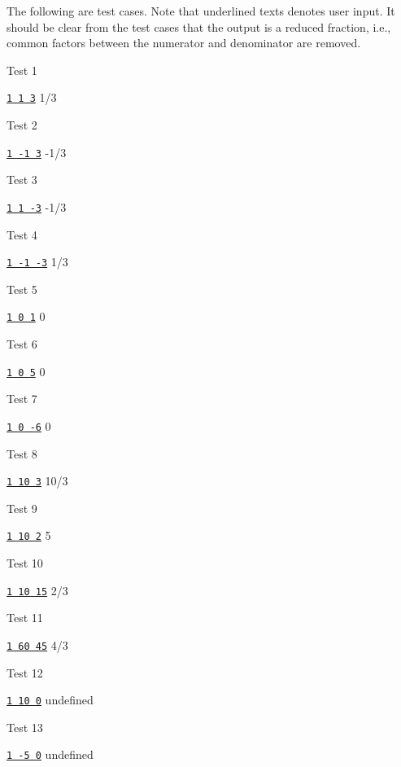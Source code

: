 The following are test cases. Note that underlined texts denotes
user input.
It should be clear from the test cases that the output
is a reduced fraction, i.e., common factors between the numerator
and denominator are removed.

Test 1
\begin{console}[commandchars=\\\{\}]
\underline{\texttt{1 1 3}}
1/3
\end{console}

Test 2
\begin{console}[commandchars=\\\{\}]
\underline{\texttt{1 -1 3}}
-1/3
\end{console}

Test 3
\begin{console}[commandchars=\\\{\}]
\underline{\texttt{1 1 -3}}
-1/3
\end{console}

Test 4
\begin{console}[commandchars=\\\{\}]
\underline{\texttt{1 -1 -3}}
1/3
\end{console}

Test 5
\begin{console}[commandchars=\\\{\}]
\underline{\texttt{1 0 1}}
0
\end{console}

Test 6
\begin{console}[commandchars=\\\{\}]
\underline{\texttt{1 0 5}}
0
\end{console}

Test 7
\begin{console}[commandchars=\\\{\}]
\underline{\texttt{1 0 -6}}
0
\end{console}

Test 8
\begin{console}[commandchars=\\\{\}]
\underline{\texttt{1 10 3}}
10/3
\end{console}

Test 9
\begin{console}[commandchars=\\\{\}]
\underline{\texttt{1 10 2}}
5
\end{console}

Test 10
\begin{console}[commandchars=\\\{\}]
\underline{\texttt{1 10 15}}
2/3
\end{console}

Test 11
\begin{console}[commandchars=\\\{\}]
\underline{\texttt{1 60 45}}
4/3
\end{console}

Test 12
\begin{console}[commandchars=\\\{\}]
\underline{\texttt{1 10 0}}
undefined
\end{console}

Test 13
\begin{console}[commandchars=\\\{\}]
\underline{\texttt{1 -5 0}}
undefined
\end{console}
